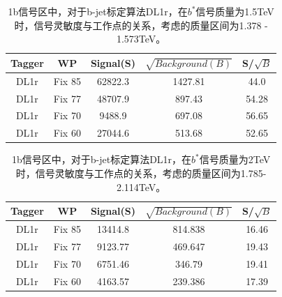 \begin{table}[ht]
        \begin{center}
                \begin{tabular}{|c|c|c|c|c|}\hline
                        Tagger       & WP          & Signal(S)    & $\sqrt{Background(B)}$    & S/$\sqrt{B}$ \\\hline
                        DL1r          & Fix 85      & 62822.3       &   1427.81      & 44.0     \\
                        DL1r          & Fix 77      & 48707.9      &  897.43       &   54.28    \\
                        DL1r          & Fix 70      & 9488.9     &  697.08      &  56.65      \\
                        DL1r          & Fix 60      & 27044.6       &  513.68        & 52.65        \\
                        \hline
                \end{tabular}
        \end{center}
        \caption{
        1b信号区中，对于b-jet标定算法DL1r，在$b^*$信号质量为1.5TeV时，信号灵敏度与工作点的关系，考虑的质量区间为1.378 - 1.573TeV。
        }
        \label{tab:Sensbstar1p5TeV}
\end{table}%


\begin{table}[ht]
        \begin{center}
                \begin{tabular}{|c|c|c|c|c|}\hline
                        Tagger       & WP          & Signal(S)    & $\sqrt{Background(B)}$    & S/$\sqrt{B}$ \\\hline
                        DL1r          & Fix 85      & 13414.8      & 814.838        & 16.46       \\
                        DL1r          & Fix 77      & 9123.77      & 469.647       & 19.43    \\
                        DL1r          & Fix 70      & 6751.46      &  346.79       & 19.41       \\
                        DL1r          & Fix 60      & 4163.57     & 239.386         & 17.39    \\
                        \hline
                \end{tabular}
        \end{center}
        \caption{
        1b信号区中，对于b-jet标定算法DL1r，在$b^*$信号质量为2TeV时，信号灵敏度与工作点的关系，考虑的质量区间为1.785-2.114TeV。
        }
        \label{tab:Sensbstar2TeV}
\end{table}%

